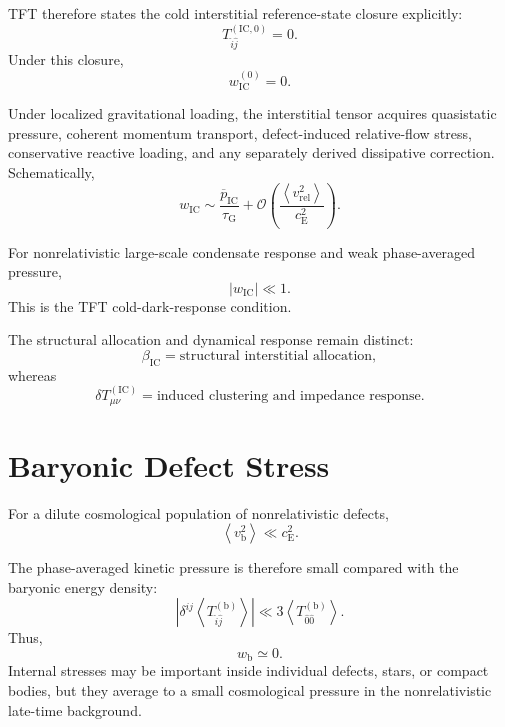TFT therefore states the cold interstitial reference-state closure explicitly:
\begin{equation}
    T_{\hat{i}\hat{j}}^{(\mathrm{IC},0)}=0.
\end{equation}
Under this closure,
\begin{equation}
    w_{\mathrm{IC}}^{(0)}=0.
\end{equation}

Under localized gravitational loading, the interstitial tensor acquires quasistatic pressure, coherent momentum transport, defect-induced relative-flow stress, conservative reactive loading, and any separately derived dissipative correction. Schematically,
\begin{equation}
    w_{\mathrm{IC}} \sim \frac{\overline{p}_{\mathrm{IC}}}{\tau_{\mathrm{G}}} + \mathcal{O} \left( \frac{ \left\langle v_{\mathrm{rel}}^2 \right\rangle }{ c_{\mathrm{E}}^2 } \right).
\end{equation}

For nonrelativistic large-scale condensate response and weak phase-averaged pressure,
\begin{equation}
    |w_{\mathrm{IC}}|\ll1.
\end{equation}
This is the TFT cold-dark-response condition.

The structural allocation and dynamical response remain distinct:
\begin{equation}
    \beta_{\mathrm{IC}} = \text{structural interstitial allocation},
\end{equation}
whereas
\begin{equation}
    \delta T_{\mu\nu}^{(\mathrm{IC})} = \text{induced clustering and impedance response}.
\end{equation}

\section{Baryonic Defect Stress}

For a dilute cosmological population of nonrelativistic defects,
\begin{equation}
    \left\langle v_{\mathrm{b}}^2 \right\rangle \ll c_{\mathrm{E}}^2.
\end{equation}

The phase-averaged kinetic pressure is therefore small compared with the baryonic energy density:
\begin{equation}
    \left| \delta^{ij} \left\langle T_{\hat{i}\hat{j}}^{(\mathrm{b})} \right\rangle \right| \ll 3 \left\langle T_{\hat{0}\hat{0}}^{(\mathrm{b})} \right\rangle.
\end{equation}
Thus,
\begin{equation}
    w_{\mathrm{b}}\simeq0.
\end{equation}
Internal stresses may be important inside individual defects, stars, or compact bodies, but they average to a small cosmological pressure in the nonrelativistic late-time background.

